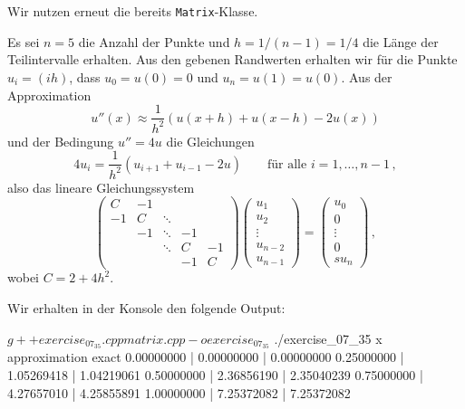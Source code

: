 \section{}

Wir nutzen erneut die bereits \texttt{Matrix}-Klasse.

Es sei $n = 5$ die Anzahl der Punkte und $h = 1/(n-1) = 1/4$ die Länge der Teilintervalle erhalten.
Aus den gebenen Randwerten erhalten wir für die Punkte $u_i = (ih)$, dass $u_0 = u(0) = 0$ und $u_n = u(1) = u(0)$.
Aus der Approximation
\[
          u''(x)
  \approx \frac{1}{h^2}( u(x+h) + u(x-h) - 2u(x))
\]
und der Bedingung $u'' = 4u$ die Gleichungen
\[
    4 u_i
  = \frac{1}{h^2}( u_{i+1} + u_{i-1} - 2u )
  \qquad
  \text{für alle $i = 1, \dotsc, n-1$} \,,
\]
also das lineare Gleichungssystem
\[
  \begin{pmatrix}
     C  & -1  &         &     &     \\
    -1  &  C  & \ddots  &     &     \\
        & -1  & \ddots  & -1  &     \\
        &     & \ddots  &  C  & -1  \\
        &     &         & -1  &  C
  \end{pmatrix}
  \begin{pmatrix}
    u_1     \\
    u_2     \\
    \vdots  \\
    u_{n-2} \\
    u_{n-1}
  \end{pmatrix}
  =
  \begin{pmatrix}
    u_0     \\
    0       \\
    \vdots  \\
    0       \\s
    u_n
  \end{pmatrix} \,,
\]
wobei $C = 2 + 4h^2$.



Wir erhalten in der Konsole den folgende Output:

\begin{consoleoutput}
$ g++ exercise_07_35.cpp matrix.cpp -o exercise_07_35
$ ./exercise_07_35                                  
x                 approximation   exact
0.00000000      | 0.00000000    | 0.00000000
0.25000000      | 1.05269418    | 1.04219061
0.50000000      | 2.36856190    | 2.35040239
0.75000000      | 4.27657010    | 4.25855891
1.00000000      | 7.25372082    | 7.25372082
\end{consoleoutput}


